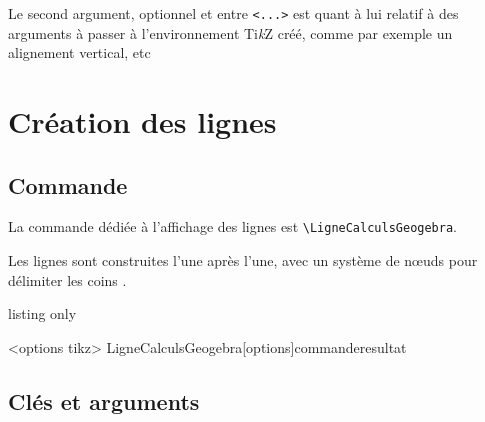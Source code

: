 \documentclass[french,a4paper,11pt]{article}
\providecommand\tikzlogo{Ti\textit{k}Z}
\let\TikZ\tikzlogo
\begin{document}
\begin{tipblock}
Le second argument, optionnel et entre \texttt{<...>} est quant à lui relatif à des arguments à passer à l'environnement \TikZ{} créé, comme par exemple un alignement vertical, etc
\end{tipblock}

\begin{PresentationCode}{}
\begin{CalculFormelGeogebra}
	[CouleurEntete=green!25,PoliceEntete=\LARGE\ttfamily,
	Titre={$\blacktriangleright$ Illustration via GeoGebra},Largeur=13]
\end{CalculFormelGeogebra}
\end{PresentationCode}

\pagebreak

\section{Création des lignes}

\subsection{Commande}

\begin{cautionblock}
La commande dédiée à l'affichage des lignes est \texttt{\textbackslash LigneCalculsGeogebra}.

Les lignes sont construites l'une après l'une, avec un système de nœuds pour délimiter les \og coins \fg.
\end{cautionblock}

\begin{PresentationCode}{listing only}
\begin{CalculFormelGeogebra}<options tikz>
	LigneCalculsGeogebra[options]{commande}{resultat}
\end{CalculFormelGeogebra}
\end{PresentationCode}

\begin{PresentationCode}{}
\begin{CalculFormelGeogebra}
\end{CalculFormelGeogebra}
\end{PresentationCode}

\subsection{Clés et arguments}
\end{document}
